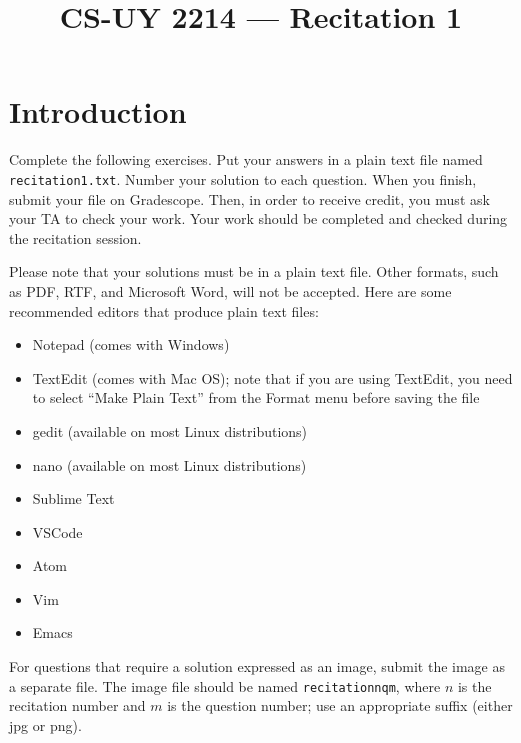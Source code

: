 \documentclass{article}
\title{CS-UY 2214 — Recitation 1}
\begin{document}
\maketitle

\section*{Introduction}
Complete the following exercises. Put your answers in a plain text file named \texttt{recitation1.txt}. Number your solution to each question. When you finish, submit your file on Gradescope. Then, in order to receive credit, you must ask your TA to check your work. Your work should be completed and checked during the recitation session.

Please note that your solutions must be in a plain text file. Other formats, such as PDF, RTF, and Microsoft Word, will not be accepted. Here are some recommended editors that produce plain text files:
\begin{itemize}
    \item Notepad (comes with Windows)
    \item TextEdit (comes with Mac OS); note that if you are using TextEdit, you need to select “Make Plain Text” from the Format menu before saving the file
    \item gedit (available on most Linux distributions)
    \item nano (available on most Linux distributions)
    \item Sublime Text
    \item VSCode
    \item Atom
    \item Vim
    \item Emacs
\end{itemize}

For questions that require a solution expressed as an image, submit the image as a separate file. The image file should be named \texttt{recitationnqm}, where $n$ is the recitation number and $m$ is the question number; use an appropriate suffix (either jpg or png).
\end{document}
